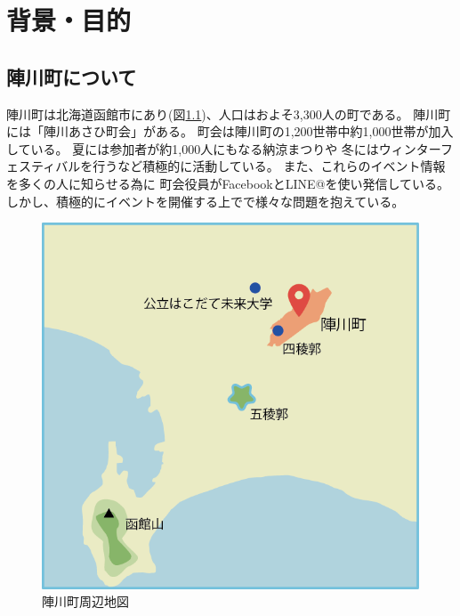 \chapter{背景・目的}

\section{陣川町について}
陣川町は北海道函館市にあり(図\ref{map})、人口はおよそ3,300人の町である。
陣川町には「陣川あさひ町会」がある。
町会は陣川町の1,200世帯中約1,000世帯が加入している。
夏には参加者が約1,000人にもなる納涼まつりや
冬にはウィンターフェスティバルを行うなど積極的に活動している。
また、これらのイベント情報を多くの人に知らせる為に
町会役員がFacebookとLINE@を使い発信している。
しかし、積極的にイベントを開催する上でで様々な問題を抱えている。
\\
\begin{figure}[h]
    \begin{center}
        \includegraphics[keepaspectratio, scale=0.7]{map.png}
        \caption{陣川町周辺地図}
        \label{map}
    \end{center}
\end{figure}

